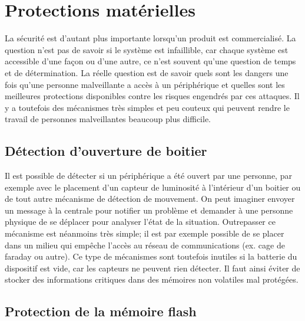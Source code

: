 \section{Protections matérielles}
\label{sec-security_hardware_protections}

La sécurité est d'autant plus importante lorsqu'un produit est commercialisé. La question n'est pas de savoir si le système est infaillible, car chaque système est accessible d'une façon ou d'une autre, ce n'est souvent qu'une question de temps et de détermination. La réelle question est de savoir quels sont les dangers une fois qu'une personne malveillante a accès à un périphérique et quelles sont les meilleures protections disponibles contre les risques engendrés par ces attaques. Il y a toutefois des mécanismes très simples et peu couteux qui peuvent rendre le travail de personnes malveillantes beaucoup plus difficile. 


\subsection{Détection d'ouverture de boitier}

Il est possible de détecter si un périphérique a été ouvert par une personne, par exemple avec le placement d'un capteur de luminosité à l'intérieur d'un boitier ou de tout autre mécanisme de détection de mouvement. On peut imaginer envoyer un message à la centrale pour notifier un problème et demander à une personne physique de se déplacer pour analyser l'état de la situation. Outrepasser ce mécanisme est néanmoins très simple; il est par exemple possible de se placer dans un milieu qui empêche l'accès au réseau de communications (ex. cage de faraday ou autre). Ce type de mécanismes sont toutefois inutiles si la batterie du dispositif est vide, car les capteurs ne peuvent rien détecter. Il faut ainsi éviter de stocker des informations critiques dans des mémoires non volatiles mal protégées.

\subsection{Protection de la mémoire flash}

